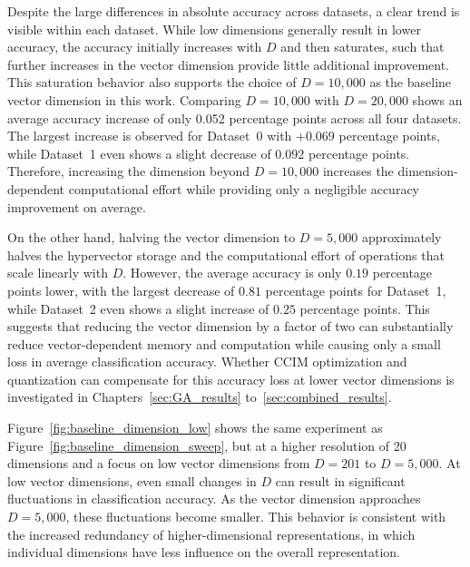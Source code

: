 Despite the large differences in absolute accuracy across datasets, a clear trend is visible within each dataset. While low dimensions generally result in lower accuracy, the accuracy initially increases with $D$ and then saturates, such that further increases in the vector dimension provide little additional improvement. This saturation behavior also supports the choice of $D=10{,}000$ as the baseline vector dimension in this work. Comparing $D=10{,}000$ with $D=20{,}000$ shows an average accuracy increase of only 0.052 percentage points across all four datasets. The largest increase is observed for Dataset~0 with $+0.069$ percentage points, while Dataset~1 even shows a slight decrease of $0.092$ percentage points. Therefore, increasing the dimension beyond $D=10{,}000$ increases the dimension-dependent computational effort while providing only a negligible accuracy improvement on average.

On the other hand, halving the vector dimension to $D=5{,}000$ approximately halves the hypervector storage and the computational effort of operations that scale linearly with $D$. However, the average accuracy is only $0.19$ percentage points lower, with the largest decrease of $0.81$ percentage points for Dataset~1, while Dataset~2 even shows a slight increase of $0.25$ percentage points. This suggests that reducing the vector dimension by a factor of two can substantially reduce vector-dependent memory and computation while causing only a small loss in average classification accuracy. Whether \ac{CCIM} optimization and quantization can compensate for this accuracy loss at lower vector dimensions is investigated in Chapters~\ref{sec:GA_results} to~\ref{sec:combined_results}.

Figure~\ref{fig:baseline_dimension_low} shows the same experiment as Figure~\ref{fig:baseline_dimension_sweep}, but at a higher resolution of 20 dimensions and a focus on low vector dimensions from $D=201$ to $D=5{,}000$. At low vector dimensions, even small changes in $D$ can result in significant fluctuations in classification accuracy. As the vector dimension approaches $D=5{,}000$, these fluctuations become smaller. This behavior is consistent with the increased redundancy of higher-dimensional representations, in which individual dimensions have less influence on the overall representation.

